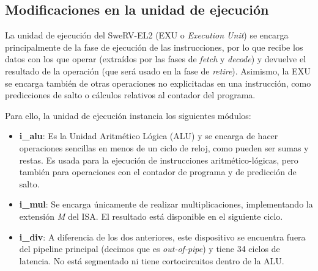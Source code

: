\subsection{Modificaciones en la unidad de ejecución}
\label{subsec:exu_mods}
La unidad de ejecución del SweRV-EL2 (EXU o \textit{Execution Unit}) se encarga principalmente de la fase de ejecución de las instrucciones, por lo que recibe los datos con los que operar (extraídos por las fases de \textit{fetch} y \textit{decode}) y devuelve el resultado de la operación (que será usado en la fase de \textit{retire}). Asimismo, la EXU se encarga también de otras operaciones no explicitadas en una instrucción, como predicciones de salto o cálculos relativos al contador del programa. 

Para ello, la unidad de ejecución instancia los siguientes módulos:

\begin{itemize}
    \item \textbf{i\_alu}: Es la Unidad Aritmético Lógica (ALU) y se encarga de hacer operaciones sencillas en menos de un ciclo de reloj, como pueden ser sumas y restas. Es usada para la ejecución de instrucciones aritmético-lógicas, pero también para operaciones con el contador de programa y de predicción de salto.
    \item \textbf{i\_mul}: Se encarga únicamente de realizar multiplicaciones, implementando la extensión \textit{M} del ISA. El resultado está disponible en el siguiente ciclo.
    \item \textbf{i\_div}: A diferencia de los dos anteriores, este dispositivo se encuentra fuera del pipeline principal (decimos que es \textit{out-of-pipe}) y tiene 34 ciclos de latencia. No está segmentado ni tiene cortocircuitos dentro de la ALU.
\end{itemize}

